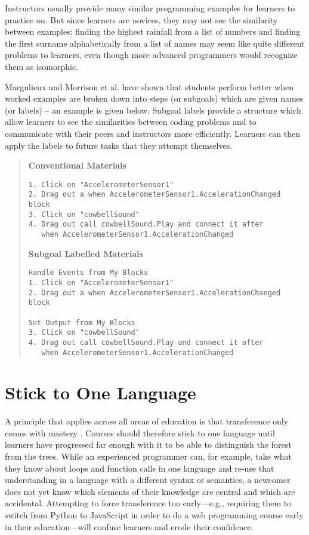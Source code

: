 Instructors usually provide many similar programming examples for
learners to practice on.  But since learners are novices, they may not
see the similarity between examples: finding the highest rainfall from
a list of numbers and finding the first surname alphabetically from a
list of names may seem like quite different problems to learners, even
though more advanced programmers would recognize them as isomorphic.

Margulieux and Morrison et al. \cite{Morr2015,Morr2016,Marg2012} have
shown that students perform better when worked examples are broken
down into steps (or subgoals) which are given names (or labels) -- an
example is given below.  Subgoal labels provide a structure which
allow learners to see the similarities between coding problems and to
communicate with their peers and instructors more efficiently.
Learners can then apply the labels to future tasks that they attempt
themselves.

\begin{quote}
\noindent
\textbf{Conventional Materials}
\begin{verbatim}
1. Click on "AccelerometerSensor1"
2. Drag out a when AccelerometerSensor1.AccelerationChanged block
3. Click on "cowbellSound"
4. Drag out call cowbellSound.Play and connect it after
   when AccelerometerSensor1.AccelerationChanged
\end{verbatim}

\noindent
\textbf{Subgoal Labelled Materials}
\begin{verbatim}
Handle Events from My Blocks
1. Click on "AccelerometerSensor1"
2. Drag out a when AccelerometerSensor1.AccelerationChanged block

Set Output from My Blocks
3. Click on "cowbellSound"
4. Drag out call cowbellSound.Play and connect it after
   when AccelerometerSensor1.AccelerationChanged
\end{verbatim}
\end{quote}

\section*{Stick to One Language}

A principle that applies across all areas of education is that
transference only comes with mastery \cite{Gick1987}.  Courses should
therefore stick to one language until learners have progressed far
enough with it to be able to distinguish the forest from the trees.
While an experienced programmer can, for example, take what they know
about loops and function calls in one language and re-use that
understanding in a language with a different syntax or semantics, a
newcomer does not yet know which elements of their knowledge are
central and which are accidental.  Attempting to force transference
too early---e.g., requiring them to switch from Python to JavaScript
in order to do a web programming course early in their
education---will confuse learners and erode their confidence.


